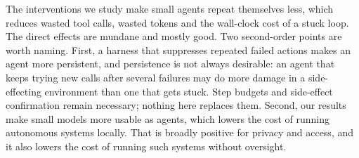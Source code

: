 The interventions we study make small agents repeat themselves less, which
reduces wasted tool calls, wasted tokens and the wall-clock cost of a stuck
loop. The direct effects are mundane and mostly good. Two second-order points
are worth naming. First, a harness that suppresses repeated failed actions makes
an agent more persistent, and persistence is not always desirable: an agent that
keeps trying new calls after several failures may do more damage in a
side-effecting environment than one that gets stuck. Step budgets and
side-effect confirmation remain necessary; nothing here replaces them. Second,
our results make small models more usable as agents, which lowers the cost of
running autonomous systems locally. That is broadly positive for privacy and
access, and it also lowers the cost of running such systems without oversight.
